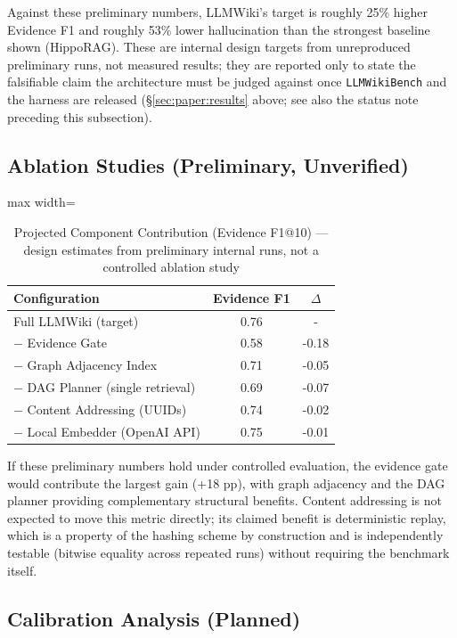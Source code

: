 Against these preliminary numbers, LLMWiki's target is roughly 25\% higher Evidence F1 and roughly 53\% lower hallucination than the strongest baseline shown (HippoRAG). These are internal design targets from unreproduced preliminary runs, not measured results; they are reported only to state the falsifiable claim the architecture must be judged against once \texttt{LLMWikiBench} and the harness are released (\S\ref{sec:paper:results} above; see also the status note preceding this subsection).

\subsection{Ablation Studies (Preliminary, Unverified)}
\label{sec:paper:ablation}

\begin{table}[htbp]
\centering
\caption{Projected Component Contribution (Evidence F1@10) --- design estimates from preliminary internal runs, not a controlled ablation study}
\label{tab:paper:ablation}
\begin{adjustbox}{max width=\textwidth}
\begin{tabular}{lcc}
\toprule
\textbf{Configuration} & \textbf{Evidence F1} & \textbf{$\Delta$} \\
\midrule
Full LLMWiki (target) & 0.76 & - \\
$-$ Evidence Gate & 0.58 & -0.18 \\
$-$ Graph Adjacency Index & 0.71 & -0.05 \\
$-$ DAG Planner (single retrieval) & 0.69 & -0.07 \\
$-$ Content Addressing (UUIDs) & 0.74 & -0.02 \\
$-$ Local Embedder (OpenAI API) & 0.75 & -0.01 \\
\bottomrule
\end{tabular}
\end{adjustbox}
\end{table}

If these preliminary numbers hold under controlled evaluation, the evidence gate would contribute the largest gain (+18 pp), with graph adjacency and the DAG planner providing complementary structural benefits. Content addressing is not expected to move this metric directly; its claimed benefit is deterministic replay, which is a property of the hashing scheme by construction and is independently testable (bitwise equality across repeated runs) without requiring the benchmark itself.

\subsection{Calibration Analysis (Planned)}

